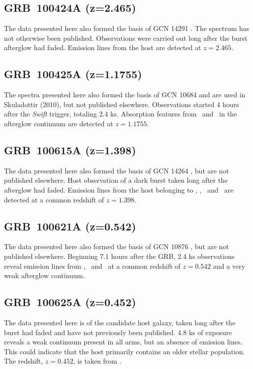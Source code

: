 \documentclass[longauth]{aa}    %
\begin{document}
\subsection{GRB~100424A (z=2.465)} \label{100424}

The data presented here also formed the basis of GCN 
14291 \citep{GCN14291}. The spectrum has
not otherwise been published. Observations were carried out long after the burst
afterglow had faded. Emission lines from the host are detected at $z=2.465$.

\subsection{GRB~100425A (z=1.1755)} \label{100425}

The spectra presented here also formed the basis of GCN 10684 \citep{GCN10684}
and are used in Skuladottir (2010), but not published elsewhere. Observations
started 4 hours after the \textit{Swift} trigger, totaling 2.4 ks. Absorption
features from \mgii~and \feii~in the afterglow continuum are detected at
$z=1.1755$.

\subsection{GRB~100615A (z=1.398)} \label{100615}

The data presented here also formed the basis of GCN 
14264 \citep{GCN14264}, but are not
published elsewhere. Host observation of a dark burst \citep{DElia2011} taken
long after the afterglow had faded. Emission lines from the host belonging to
\oii, \neiii, \oiii~and \ha~are detected at a common redshift of $z=1.398$.

\subsection{GRB~100621A (z=0.542)} \label{100621}

The data presented here also formed the basis of GCN 
10876 \citep{GCN10876}, but are not
published elsewhere. Beginning 7.1 hours after the GRB, 2.4 ks observations
reveal emission lines from \oii, \hb~and \oiii~at a common redshift of $z=0.542$
and a very weak afterglow continuum.

\subsection{GRB~100625A (z=0.452)} \label{100625}

The data presented here is of the candidate host galaxy, taken long after the
burst had faded and have not previously been published. 4.8 ks of exposure
reveals a weak continuum present in all arms, but an absence of emission lines.
This could indicate that the host primarily contains an older stellar
population. The redshift, $z=0.452$, is taken from \citet{Fong2013}.
\end{document}
